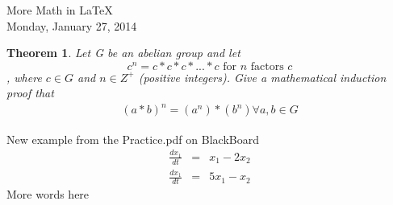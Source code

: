 \documentclass{article}
\newtheorem{theorem}{Theorem}
\begin{document}
\begin{center}
More Math in \LaTeX{} \\
Monday, January 27, 2014
\end{center}

\begin{theorem}
Let G be an abelian group and let $$c^n = c*c*c*...*c \mbox{ for $n$ factors $c$} $$, 
where $c \in G$ and $n \in Z^+$ (positive integers). Give a mathematical 
induction proof that 
\begin{eqnarray}
(a*b)^n = (a^n)*(b^n) \forall a,b \in G
\end{eqnarray}
\end{theorem}

New example from the Practice.pdf on BlackBoard
\begin{eqnarray*}
\frac{dx_1}{dt} & = & x_1 - 2x_2 \\
\frac{dx_1}{dt} & = & 5x_1 - x_2
\end{eqnarray*}
More words here
\end{document}

